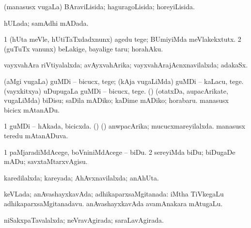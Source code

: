 \bentry
{} 
\gl{\gu}
\expl{}
\bmng
(manasusx \mo vugaLa) BAraviLisida; haguragoLisida; horeyiLisida. 
\emng
\eentry

\bentry
{} 
\gl{\gu}
\expl{}
\bmng
hULada; samAdhi mADada. 
\emng
\eentry

\bentry
{} 
\gl{\sakirx}
\bmng
\bnum
\num{1} (hUta meVle, hUtiTaTxdadxnunx) agedu tege; BUmiyiMda meVlakekxtutx. 
\num{2} (guTuTx \mo vanunx) beLakige, bayalige taru; horahAku. 
\enum
\emng
\eentry

\bentry
{} 
\gl{\gu}
\expl{}
\bmng
vayxvahAra riVtiyalalxda; avAyxvahArika; vayxvahArajAcnxnavilalxda; adakaSx. 
\emng
\eentry

\bentry
{} 
\gl{\sakirx}
\expl{}
\bmng
\bnum
{} 
\banum
{} (aMgi \mo vugaLa) guMDi -- bicucx, tege; (kAja \mo vugaLiMda) guMDi -- kaLacu, tege. 
 (vayxkitxya) uDupugaLa guMDi -- bicucx, tege. 
\eanum
\numie
{} (\AmA) 
\banum
{} (otatxDa, aupacArikate, \mo vugaLiMda) biDisu; saDila mADiko; kaDime mADiko; horabaru. 
 manasusx bicicx mAtanADu. 
\eanum
\numie
\enum
\emng
\eentry

\bentry
{} 
\gl{\gu}
\expl{}
\bmng
\bnum
\num{1} guMDi -- hAkada, bicicxda. 
 (\rUpa) (\AmA) 
\banum
{} anwpacArika; mucucxmareyilalxda. 
 manasusx teredu mAtanADuva. 
\eanum
\numie
\enum
\emng
\eentry

\bentry
{} 
\gl{\sakirx}
\expl{}
\bmng
\bnum
\num{1} paMjaradiMdAcege, boVniniMdAcege -- biDu. 
\num{2} sereyiMda biDu; biDugaDe mADu; savxtaMtarxvAgisu. 
\enum
\emng
\eentry

\bentry
{} 
\gl{\gu}
\bmng
karedilalxda; kareyada; AhAvxnavilalxda; anAhUta. 
\emng
\eentry

\bentry
{} 
\gl{\gu}
\expl{}
\bmng
keVLada; anAvashayxkavAda; adhikaparxsaMgitanada:  iMtha TiVkegaLu adhikaparxsaMgitanadavu.  anAvashayxkavAda avamAnakara mAtugaLu. 
\emng
\eentry

\bentry
{} 
\gl{\gu}
\expl{}
\bmng
niSakxpaTavalalxda; neVravAgirada; saraLavAgirada. 
\emng
\eentry

